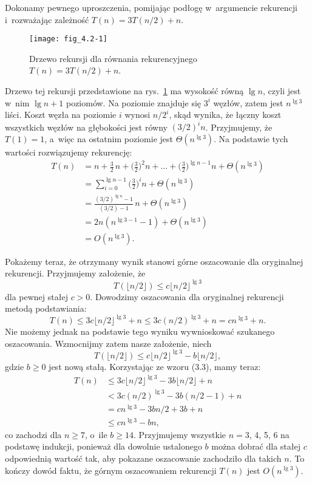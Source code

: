 
\exercise %
Dokonamy pewnego uproszczenia, pomijając podłogę w~argumencie rekurencji i~rozważając zależność $T(n)=3T(n/2)+n$.
\begin{figure}[ht]
	\centering \texttt{[image: fig\_4.2-1]}
	\caption{Drzewo rekursji dla równania rekurencyjnego $T(n)=3T(n/2)+n$.} \label{fig:4.2-1}
\end{figure}
Drzewo tej rekursji przedstawione na rys.\ \ref{fig:4.2-1} ma wysokość równą $\lg n$, czyli jest w~nim $\lg n+1$ poziomów.
Na  poziomie znajduje się $3^i$ węzłów, zatem jest $n^{\lg3}$ liści.
Koszt węzła na poziomie $i$ wynosi $n/2^i$, skąd wynika, że łączny koszt wszystkich węzłów na  głębokości jest równy $(3/2)^in$.
Przyjmujemy, że $T(1)=1$, a~więc na ostatnim poziomie jest $\Theta(n^{\lg3})$.
Na podstawie tych wartości rozwiązujemy rekurencję:
\begin{align*}
	T(n) &= n+\frac{3}{2}\,n+\biggl(\frac{3}{2}\biggr)^2n+\dots+\biggl(\frac{3}{2}\biggr)^{\lg n-1}n+\Theta(n^{\lg3}) \\
	&= \sum_{i=0}^{\lg n-1}\biggl(\frac{3}{2}\biggr)^in+\Theta(n^{\lg3}) \\
	&= \frac{(3/2)^{\lg n}-1}{(3/2)-1}\,n+\Theta(n^{\lg3}) \\[1mm]
	&= 2n(n^{\lg3-1}-1)+\Theta(n^{\lg3}) \\
	&= O(n^{\lg3}).
\end{align*}

Pokażemy teraz, że otrzymany wynik stanowi górne oszacowanie dla oryginalnej rekurencji.
Przyjmujemy założenie, że
\[
    T(\lfloor n/2\rfloor)\le c\lfloor n/2\rfloor^{\lg3}
\]
dla pewnej stałej $c>0$.
Dowodzimy oszacowania dla oryginalnej rekurencji metodą podstawiania:
\[
	T(n) \le 3c\lfloor n/2\rfloor^{\lg3}+n \le 3c(n/2)^{\lg3}+n = cn^{\lg3}+n.
\]
Nie możemy jednak na podstawie tego wyniku wywnioskować szukanego oszacowania.
Wzmocnijmy zatem nasze założenie, niech
\[
	T(\lfloor n/2\rfloor) \le c\lfloor n/2\rfloor^{\lg3}-b\lfloor n/2\rfloor,
\]
gdzie $b\ge0$ jest nową stałą.
Korzystając ze wzoru (3.3), mamy teraz:
\begin{align*}
	T(n) &\le 3c\lfloor n/2\rfloor^{\lg3}-3b\lfloor n/2\rfloor+n \\
	&< 3c(n/2)^{\lg3}-3b(n/2-1)+n \\
	&= cn^{\lg3}-3bn/2+3b+n \\
	&\le cn^{\lg3}-bn,
\end{align*}
co zachodzi dla $n\ge7$, o~ile $b\ge14$.
Przyjmujemy wszystkie $n=3$, 4, 5, 6 na podstawę indukcji, ponieważ dla dowolnie ustalonego $b$ można dobrać dla stałej $c$ odpowiednią wartość tak, aby pokazane oszacowanie zachodziło dla takich $n$.
To kończy dowód faktu, że górnym oszacowaniem rekurencji $T(n)$ jest $O(n^{\lg3})$.

